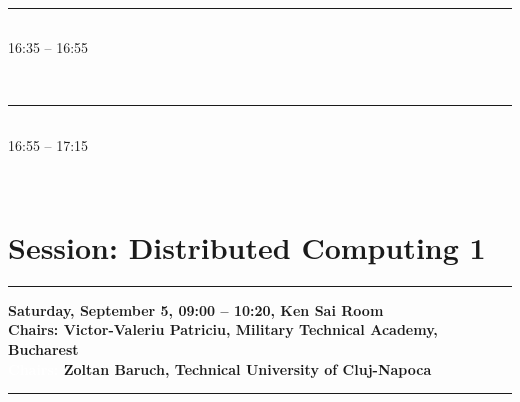             
            \\ 
            \noindent\rule{\textwidth}{0.4pt}
\vspace*{-36pt}\subsection[ 
    	   {\bf Semantic Investigation of a Control-Flow Subset of BPMN 2.0
           } \\
           {\it Eneia Nicolae Todoran, Paulina Mitrea
           }
	]
	    {
            }
	    16:35 -- 16:55 \nopagebreak

            
            \\ 
            \noindent\rule{\textwidth}{0.4pt}
\vspace*{-36pt}\subsection[ 
    	   {\bf Routing Enhancements based on Evolutionary Algorithm
           } \\
           {\it Iulia Maria Florea, Laura Gheorghe, Mihai Carabas, Nicolae Tapus
           }
	]
	    {
            }
	    16:55 -- 17:15 \nopagebreak

            
            \\ 
            
\section{{\bf \large Session: %
Distributed Computing 1
}} \vspace{-15pt} %
\noindent\rule{\textwidth}{0.4pt} \nopagebreak
{\bf  
Saturday, September 5, 09:00 -- 10:20, Ken Sai Room
} \\ \nopagebreak
{\bf  Chairs: 
Victor-Valeriu Patriciu, Military Technical Academy, Bucharest
} \\ \nopagebreak 
{\bf  \textcolor{white}{Chairs:} 
Zoltan Baruch, Technical University of Cluj-Napoca
} \\ \nopagebreak 
\noindent\rule{\textwidth}{0.4pt} \nopagebreak
            

